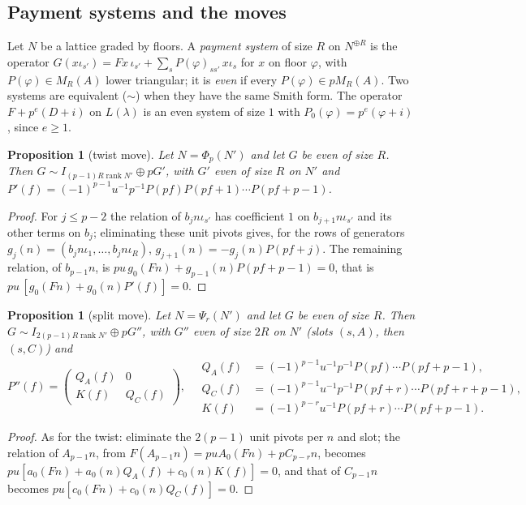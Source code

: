 \documentclass[10pt]{article}
\theoremstyle{ds}
\newtheorem{proposition}[lemma]{Proposition}
\theoremstyle{dsrem}
\begin{document}
\subsection{Payment systems and the moves}
Let $N$ be a lattice graded by floors. A \emph{payment system} of size $R$ on $N^{\oplus R}$ is the operator $G(x\iota_{s'})=Fx\,\iota_{s'}+\sum_sP(\varphi)_{ss'}\,x\iota_s$ for $x$ on floor $\varphi$, with $P(\varphi)\in M_R(A)$ lower triangular; it is \emph{even} if every $P(\varphi)\in pM_R(A)$. Two systems are equivalent ($\sim$) when they have the same Smith form. The operator $F+p^e(D+i)$ on $L(\lambda)$ is an even system of size $1$ with $P_0(\varphi)=p^e(\varphi+i)$, since $e\ge1$.

\begin{proposition}[twist move]\label{twistmove}
Let $N=\Phi_p(N')$ and let $G$ be even of size $R$. Then $G\sim I_{(p-1)R\operatorname{rank}N'}\oplus pG'$, with $G'$ even of size $R$ on $N'$ and
$P'(f)=(-1)^{p-1}u^{-1}p^{-1}P(pf)P(pf+1)\cdots P(pf+p-1)$.
\end{proposition}

\begin{proof}
For $j\le p-2$ the relation of $b_jn\iota_{s'}$ has coefficient $1$ on $b_{j+1}n\iota_{s'}$ and its other terms on $b_j$; eliminating these unit pivots gives, for the rows of generators $g_j(n)=(b_jn\iota_1,\dots,b_jn\iota_R)$, $g_{j+1}(n)=-g_j(n)P(pf+j)$. The remaining relation, of $b_{p-1}n$, is $pu\,g_0(Fn)+g_{p-1}(n)P(pf+p-1)=0$, that is $pu\,[g_0(Fn)+g_0(n)P'(f)]=0$.
\end{proof}

\begin{proposition}[split move]\label{splitmove}
Let $N=\Psi_r(N')$ and let $G$ be even of size $R$. Then $G\sim I_{2(p-1)R\operatorname{rank}N'}\oplus pG''$, with $G''$ even of size $2R$ on $N'$ (slots $(s,A)$, then $(s,C)$) and
\[
P''(f)=\begin{pmatrix}Q_A(f)&0\\ K(f)&Q_C(f)\end{pmatrix},\quad
\begin{aligned}Q_A(f)&=(-1)^{p-1}u^{-1}p^{-1}P(pf)\cdots P(pf+p-1),\\ Q_C(f)&=(-1)^{p-1}u^{-1}p^{-1}P(pf+r)\cdots P(pf+r+p-1),\\ K(f)&=(-1)^{p-r}u^{-1}P(pf+r)\cdots P(pf+p-1).\end{aligned}
\]
\end{proposition}

\begin{proof}
As for the twist: eliminate the $2(p-1)$ unit pivots per $n$ and slot; the relation of $A_{p-1}n$, from $F(A_{p-1}n)=puA_0(Fn)+pC_{p-r}n$, becomes $pu[a_0(Fn)+a_0(n)Q_A(f)+c_0(n)K(f)]=0$, and that of $C_{p-1}n$ becomes $pu[c_0(Fn)+c_0(n)Q_C(f)]=0$.
\end{proof}
\end{document}

